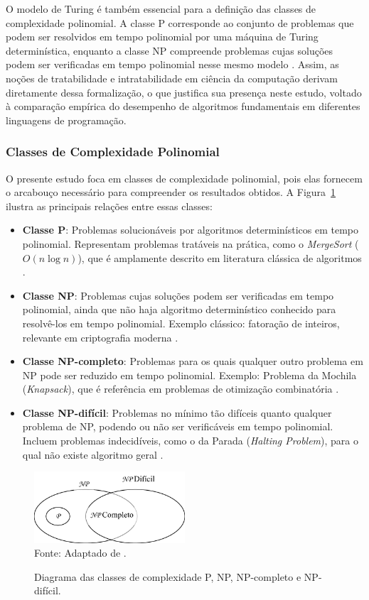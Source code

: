 \documentclass[12pt,a4paper]{article}
\newcommand{\eng}[1]{\textit{#1}}
\begin{document}
O modelo de Turing é também essencial para a definição das classes de complexidade polinomial. A classe P corresponde ao conjunto de problemas que podem ser resolvidos em tempo polinomial por uma máquina de Turing determinística, enquanto a classe NP compreende problemas cujas soluções podem ser verificadas em tempo polinomial nesse mesmo modelo \cite{garey1979, sipser2012}. Assim, as noções de tratabilidade e intratabilidade em ciência da computação derivam diretamente dessa formalização, o que justifica sua presença neste estudo, voltado à comparação empírica do desempenho de algoritmos fundamentais em diferentes linguagens de programação.

\subsubsection{Classes de Complexidade Polinomial}
O presente estudo foca em classes de complexidade polinomial, pois elas fornecem o arcabouço necessário para compreender os resultados obtidos. A Figura~\ref{fig:complexidade} ilustra as principais relações entre essas classes:

\begin{itemize}
  \item \textbf{Classe P}: Problemas solucionáveis por algoritmos determinísticos em tempo polinomial. Representam problemas tratáveis na prática, como o \eng{MergeSort} (\(O(n \log n)\)), que é amplamente descrito em literatura clássica de algoritmos .
  \item \textbf{Classe NP}: Problemas cujas soluções podem ser verificadas em tempo polinomial, ainda que não haja algoritmo determinístico conhecido para resolvê-los em tempo polinomial. Exemplo clássico: fatoração de inteiros, relevante em criptografia moderna .
  \item \textbf{Classe NP-completo}: Problemas para os quais qualquer outro problema em NP pode ser reduzido em tempo polinomial. Exemplo: Problema da Mochila (\eng{Knapsack}), que é referência em problemas de otimização combinatória .
  \item \textbf{Classe NP-difícil}: Problemas no mínimo tão difíceis quanto qualquer problema de NP, podendo ou não ser verificáveis em tempo polinomial. Incluem problemas indecidíveis, como o da Parada (\eng{Halting Problem}), para o qual não existe algoritmo geral .
\end{itemize}

\begin{figure}[H]
  \caption{Diagrama das classes de complexidade P, NP, NP-completo e NP-difícil.}
  \centering
  \includegraphics[width=0.5\textwidth]{img/relacaoDeConjuntos.png}
  \label{fig:complexidade}
  \\ \small Fonte: Adaptado de .
\end{figure}
\end{document}
